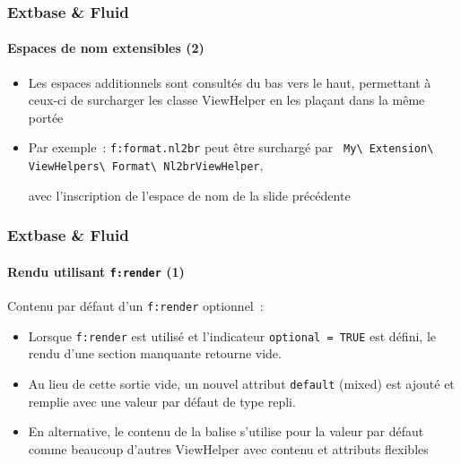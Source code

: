 
\begin{frame}[fragile]
	\frametitle{Extbase \& Fluid}
	\framesubtitle{Espaces de nom extensibles (2)}

	\begin{itemize}

		\item Les espaces additionnels sont consultés du bas vers le haut,
			permettant à ceux-ci de surcharger les classe ViewHelper en les
			plaçant dans la même portée

		\item Par exemple~: \texttt{f:format.nl2br} peut être surchargé par
			\texttt{
				My\textbackslash
				Extension\textbackslash
				ViewHelpers\textbackslash
				Format\textbackslash
				Nl2brViewHelper},

				avec l'inscription de l'espace de nom de la slide précédente

	\end{itemize}

\end{frame}


\begin{frame}[fragile]
	\frametitle{Extbase \& Fluid}
	\framesubtitle{Rendu utilisant \texttt{f:render} (1)}

	Contenu par défaut d'un \texttt{f:render} optionnel~:

	\begin{itemize}

		\item Lorsque \texttt{f:render} est utilisé et l'indicateur \texttt{optional = TRUE}
			est défini, le rendu d'une section manquante retourne vide.

		\item Au lieu de cette sortie vide, un nouvel attribut \texttt{default}
			(mixed) est ajouté et remplie avec une valeur par défaut de type repli.

		\item En alternative, le contenu de la balise s'utilise pour la valeur par défaut
			comme beaucoup d'autres ViewHelper avec contenu et attributs flexibles

	\end{itemize}

\end{frame}

